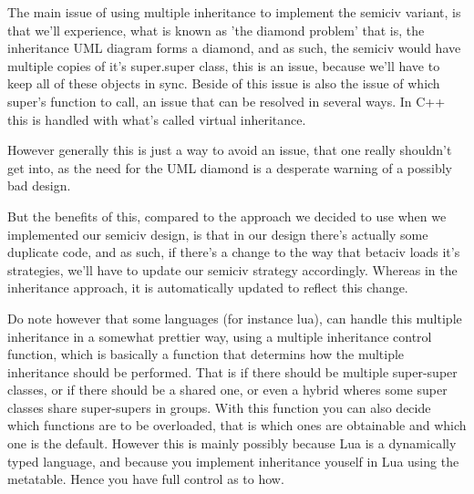 The main issue of using multiple inheritance to implement the semiciv variant,
is that we'll experience, what is known as 'the diamond problem' that is, the
inheritance UML diagram forms a diamond, and as such, the semiciv would have
multiple copies of it's super.super class, this is an issue, because we'll have
to keep all of these objects in sync.
Beside of this issue is also the issue of which super's function to call, an
issue that can be resolved in several ways.
In C++ this is handled with what's called virtual inheritance.

However generally this is just a way to avoid an issue, that one really
shouldn't get into, as the need for the UML diamond is a desperate warning of a
possibly bad design. 

But the benefits of this, compared to the approach we decided to use when we
implemented our semiciv design, is that in our design there's actually some
duplicate code, and as such, if there's a change to the way that betaciv loads
it's strategies, we'll have to update our semiciv strategy accordingly.
Whereas in the inheritance approach, it is automatically updated to reflect this change.

Do note however that some languages (for instance lua), can handle this multiple
inheritance in a somewhat prettier way, using a multiple inheritance control
function, which is basically a function that determins how the multiple
inheritance should be performed.
That is if there should be multiple super-super classes, or if there should be
a shared one, or even a hybrid wheres some super classes share super-supers in
groups.
With this function you can also decide which functions are to be overloaded,
that is which ones are obtainable and which one is the default. 
However this is mainly possibly because Lua is a dynamically typed language, and
because you implement inheritance youself in Lua using the metatable.
Hence you have full control as to how.

